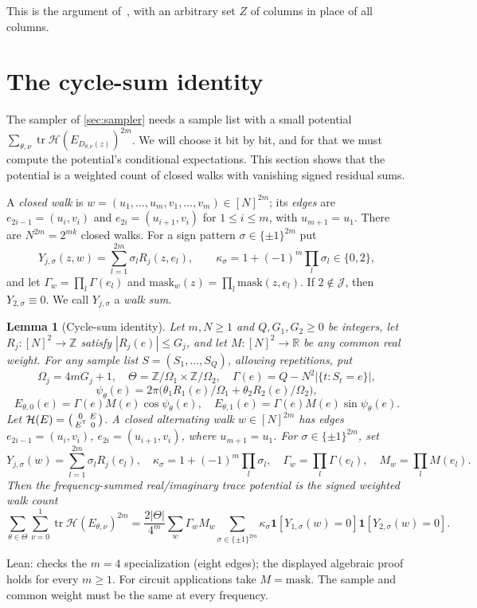 \documentclass[11pt,letterpaper]{article}
\newtheorem{lemma}[theorem]{Lemma}
\theoremstyle{definition}
\theoremstyle{remark}
\newcommand{\E}{\mathbb E}
\newcommand{\R}{\mathbb R}
\newcommand{\Z}{\mathbb Z}
\newcommand{\tr}{\operatorname{tr}}
\newcommand{\mask}{\mathrm{mask}}
\newcommand{\ind}{\mathbf 1}
\newcommand{\cH}{\mathcal H}
\newcommand{\cJ}{\mathcal J}
\begin{document}
This is the argument of~\cite[Lemma~F.1]{Nag72}, with an arbitrary
set \(Z\) of columns in place of all columns.

\section{The cycle-sum identity}\label{sec:cycle}

The sampler of \cref{sec:sampler} needs a sample list with a small
potential \(\sum_{\theta,\nu}\tr\cH(E_{D_{\theta,\nu}(z)})^{2m}\). We
will choose it bit by bit, and for that we must compute the potential's
conditional expectations. This section shows that the potential is a
weighted count of closed walks with vanishing signed residual sums.

A \emph{closed walk} is \(w=(u_1,\dots,u_m,v_1,\dots,v_m)\in[N]^{2m}\);
its \emph{edges} are \(e_{2i-1}=(u_i,v_i)\) and
\(e_{2i}=(u_{i+1},v_i)\) for \(1\le i\le m\), with \(u_{m+1}=u_1\).
There are \(N^{2m}=2^{mk}\) closed walks. For a sign pattern
\(\sigma\in\{\pm1\}^{2m}\) put
\[
 Y_{j,\sigma}(z,w)=\sum_{l=1}^{2m}\sigma_lR_j(z,e_l),\qquad
 \kappa_\sigma=1+(-1)^m\prod_l\sigma_l\in\{0,2\},
\]
and let \(\Gamma_w=\prod_l\Gamma(e_l)\) and
\(\mask_w(z)=\prod_l\mask(z,e_l)\). If \(2\notin\cJ\), then
\(Y_{2,\sigma}\equiv0\). We call \(Y_{j,\sigma}\) a \emph{walk sum}.

\begin{lemma}[Cycle-sum identity]\label{lem:cycle}
Let \(m,N\ge1\) and \(Q,G_1,G_2\ge0\) be integers, let \(R_j:[N]^2\to\Z\) satisfy \(|R_j(e)|\le G_j\), and let \(M:[N]^2\to\R\) be any common real weight.
For any sample list \(S=(S_1,\ldots,S_Q)\), allowing repetitions, put
\[
 \Omega_j=4mG_j+1,\quad \Theta=\Z/\Omega_1\times\Z/\Omega_2,
 \quad \Gamma(e)=Q-N^2|\{t:S_t=e\}|,
\]
\[
 \psi_\theta(e)=2\pi\bigl(\theta_1R_1(e)/\Omega_1+\theta_2R_2(e)/\Omega_2\bigr),
\]
\[
 E_{\theta,0}(e)=\Gamma(e)M(e)\cos\psi_\theta(e),
 \quad E_{\theta,1}(e)=\Gamma(e)M(e)\sin\psi_\theta(e).
\]
Let \(\cH(E)=\begin{psmallmatrix}0&E\\E^{\mathsf T}&0\end{psmallmatrix}\).
A closed alternating walk \(w\in[N]^{2m}\) has edges \(e_{2i-1}=(u_i,v_i)\), \(e_{2i}=(u_{i+1},v_i)\), where \(u_{m+1}=u_1\).
For \(\sigma\in\{\pm1\}^{2m}\), set
\[
 Y_{j,\sigma}(w)=\sum_{l=1}^{2m}\sigma_lR_j(e_l),\quad
 \kappa_\sigma=1+(-1)^m\prod_l\sigma_l,\quad
 \Gamma_w=\prod_l\Gamma(e_l),\quad M_w=\prod_lM(e_l).
\]
Then the frequency-summed real/imaginary trace potential is the signed weighted walk count
\[
 \sum_{\theta\in\Theta}\sum_{\nu=0}^1\tr\cH(E_{\theta,\nu})^{2m}
 =\frac{2|\Theta|}{4^m}\sum_w\Gamma_w M_w
 \sum_{\sigma\in\{\pm1\}^{2m}}\kappa_\sigma
 \ind[Y_{1,\sigma}(w)=0]\ind[Y_{2,\sigma}(w)=0].
\]
\end{lemma}
Lean:  checks the \(m=4\) specialization (eight edges); the displayed algebraic proof holds for every \(m\ge1\). For circuit applications take \(M=\mask\). The sample and common weight must be the same at every frequency.
\end{document}
